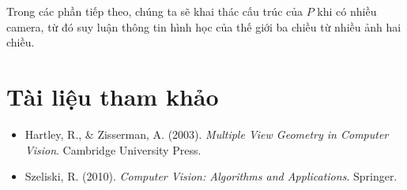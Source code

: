 Trong các phần tiếp theo, chúng ta sẽ khai thác cấu trúc của $P$ khi có nhiều camera, từ đó suy luận thông tin hình học của thế giới ba chiều từ nhiều ảnh hai chiều.

\section*{Tài liệu tham khảo}
\begin{itemize}
	\item[1] Hartley, R., \& Zisserman, A. (2003). \textit{Multiple View Geometry in Computer Vision}. Cambridge University Press.
	\item[2] Szeliski, R. (2010). \textit{Computer Vision: Algorithms and Applications}. Springer.
\end{itemize}